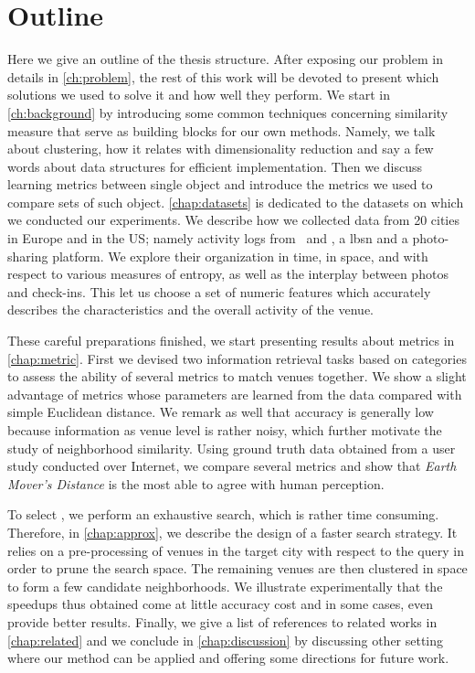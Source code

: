 \section{Outline}
\label{sec:overview}

Here we give an outline of the thesis structure.  After exposing our problem in
details in \autoref{ch:problem}, the rest of this work will be devoted to
present which solutions we used to solve it and how well they perform. We start in
\autoref{ch:background} by introducing some common techniques concerning
similarity measure that serve as building blocks for our own methods.  Namely,
we talk about clustering, how it relates with dimensionality reduction and say
a few words about data structures for efficient implementation. Then we discuss
learning metrics between single object and introduce the metrics we used to
compare sets of such object. \autoref{chap:datasets} is dedicated to the
datasets on which we conducted our experiments. We describe how we collected
data from 20 cities in Europe and in the US; namely activity logs from \fs\ and
\flickr, a \gls{lbsn} and a photo-sharing platform. We explore their
organization in time, in space, and with respect to various measures of
entropy, as well as the interplay between photos and check-ins. This let us
choose a set of numeric features which accurately describes the characteristics
and the overall activity of the venue.

These careful preparations finished, we start presenting results about
metrics in \autoref{chap:metric}. First we devised two information retrieval
tasks based on \fs{} categories to assess the ability of several metrics to match
venues together. We show a slight advantage of metrics whose parameters
are learned from the data compared with simple Euclidean distance. We remark
as well that accuracy is generally low because information as venue level is
rather noisy, which further motivate the study of neighborhood similarity.
Using ground truth data obtained from a user study conducted over Internet, we
compare several metrics and show that \emph{Earth Mover's Distance} is the
most able to agree with human perception.

To select \emd{}, we perform an exhaustive search, which is rather time
consuming. Therefore, in \autoref{chap:approx}, we describe the design of a
faster search strategy. It relies on a pre-processing of venues in the target
city with respect to the query in order to prune the search space. The
remaining venues are then clustered in space to form a few candidate
neighborhoods. We illustrate experimentally that the speedups thus obtained
come at little accuracy cost and in some cases, even provide better results.
Finally, we give a list of references to related works in
\autoref{chap:related} and we conclude in \autoref{chap:discussion} by
discussing other setting where our method can be applied and offering some
directions for future work.

